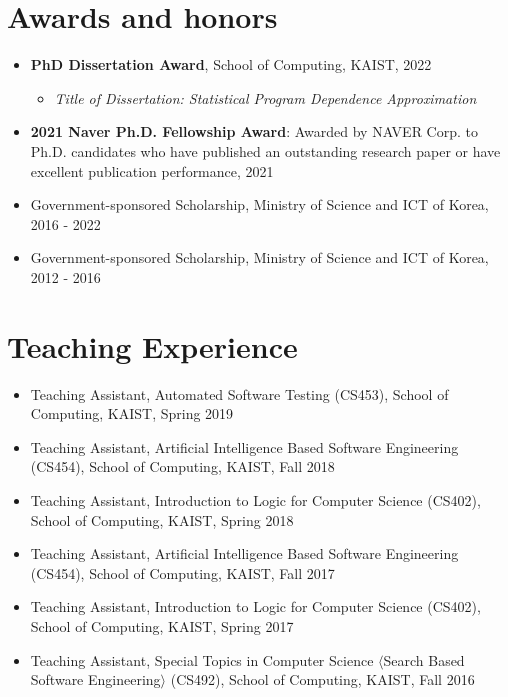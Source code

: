 \documentclass[letterpaper,11pt]{article}
\begin{document}
\section{Awards and honors}
\begin{itemize}
  \item \textbf{PhD Dissertation Award}, School of Computing, KAIST, 2022
        \vspace{-5pt}\begin{itemize}
          \item \emph{Title of Dissertation: Statistical Program Dependence Approximation}
        \end{itemize}
  \item \textbf{2021 Naver Ph.D. Fellowship Award}: Awarded by NAVER Corp. to Ph.D. candidates who have published an outstanding research paper or have excellent publication performance, 2021
  \item Government-sponsored Scholarship, Ministry of Science and ICT of Korea, 2016 - 2022
  \item Government-sponsored Scholarship, Ministry of Science and ICT of Korea, 2012 - 2016
\end{itemize}

\section{Teaching Experience}
\begin{itemize}
  \item Teaching Assistant, Automated Software Testing (CS453), School of Computing, KAIST, Spring 2019
  \item Teaching Assistant, Artificial Intelligence Based Software Engineering (CS454), School of Computing, KAIST, Fall 2018
  \item Teaching Assistant, Introduction to Logic for Computer Science (CS402), School of Computing, KAIST, Spring 2018
  \item Teaching Assistant, Artificial Intelligence Based Software Engineering (CS454), School of Computing, KAIST, Fall 2017
  \item Teaching Assistant, Introduction to Logic for Computer Science (CS402), School of Computing, KAIST, Spring 2017
  \item Teaching Assistant, Special Topics in Computer Science $\langle$Search Based Software Engineering$\rangle$ (CS492), School of Computing, KAIST, Fall 2016

\end{itemize}
\end{document}
